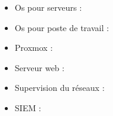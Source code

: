 \documentclass[../Livrable1.tex]{subfiles}
\begin{document}
\begin{itemize}
    \item Os pour serveurs : 
    \item Os pour poste de travail :
    \item Proxmox :
    \item Serveur web :
    \item Supervision du réseaux :
    \item SIEM : 
\end{itemize}
\end{document}
